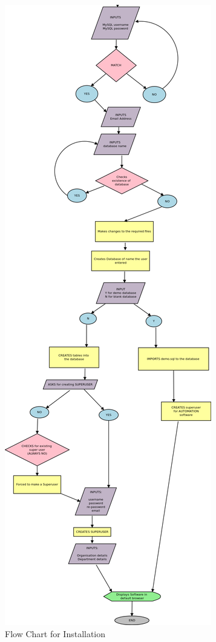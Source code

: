 \begin{figure}[h]
\centering \includegraphics[scale=0.17]{inst2.png}
\caption{Flow Chart for Installation}
\end{figure}
\newpage

